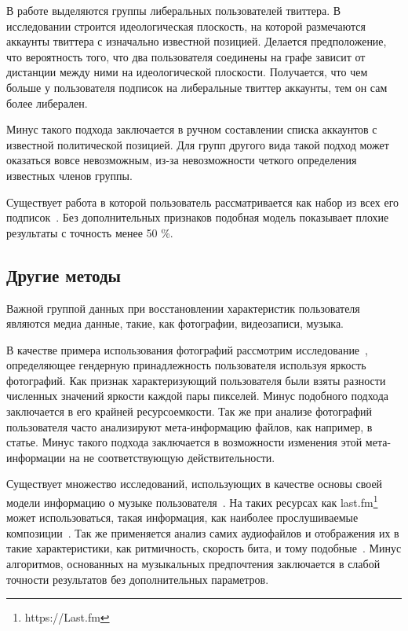 \documentclass[annotation,times,page4]{itmo-student-thesis}
\begin{document}
В работе выделяются группы либеральных пользователей твиттера. В исследовании строится идеологическая плоскость, на которой размечаются аккаунты твиттера с изначально известной позицией. Делается предположение, что вероятность того, что два пользователя соединены на графе зависит от дистанции между ними на идеологической плоскости. Получается, что чем больше у пользователя подписок на либеральные твиттер аккаунты, тем он сам более либерален.

Минус такого подхода заключается в ручном составлении списка аккаунтов с известной политической позицией. Для групп другого вида такой подход может оказаться вовсе невозможным, из-за невозможности четкого определения известных членов группы.

Существует работа в которой пользователь рассматривается как набор из всех его подписок~\cite{zheleva2009join,}. Без дополнительных признаков подобная модель показывает плохие результаты с точность менее 50 \%. 
  
\subsection{Другие методы}
Важной группой данных при восстановлении характеристик пользователя являются медиа данные, такие, как фотографии, видеозаписи, музыка. 

В качестве примера использования фотографий рассмотрим исследование~\cite{baluja2007boosting,}, определяющее гендерную принадлежность пользователя используя яркость фотографий. Как признак характеризующий пользователя были взяты разности численных значений яркости каждой пары пикселей. Минус подобного подхода заключается в его крайней ресурсоемкости. Так же при анализе фотографий пользователя часто анализируют мета-информацию файлов, как например, в статье. Минус такого подхода заключается в возможности изменения этой мета-информации на не соответствующую действительности.

Существует множество исследований, использующих в качестве основы своей модели информацию о музыке пользователя~\cite{wu2014gender,liu2012inferring}. На таких ресурсах как last.fm\footnote{https://Last.fm} может использоваться, такая информация, как наиболее прослушиваемые композиции~\cite{wu2014gender}. Так же применяется анализ самих аудиофайлов и отображения их в такие характеристики, как ритмичность, скорость бита, и тому подобные~\cite{liu2012inferring}. Минус алгоритмов, основанных на музыкальных предпочтения заключается в слабой точности результатов без дополнительных параметров.
\end{document}
